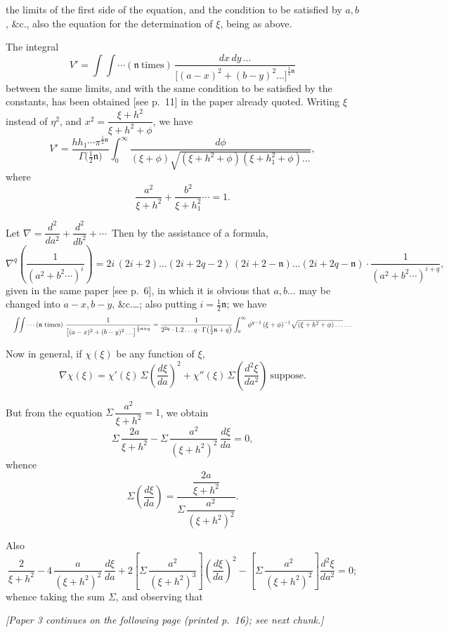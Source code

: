 \documentclass[11pt]{article}
\begin{document}
\clearpage

the limits of the first side of the equation, and the condition to be satisfied by $a, b$, \&c., also the equation for the determination of $\xi$, being as above.

The integral
\[
V' = \int\!\!\int \cdots (\mathfrak{n}\ \text{times})\,\frac{dx\,dy\,\ldots}{\bigl[(a - x)^{2} + (b - y)^{2}\ldots\bigr]^{\frac{1}{2}\mathfrak{n}}}
\]
between the same limits, and with the same condition to be satisfied by the constants, has been obtained [see p.~11] in the paper already quoted. Writing $\xi$ instead of $\eta^{2}$, and $x^{2} = \dfrac{\xi + h^{2}}{\xi + h^{2} + \phi}$, we have
\[
V' = \frac{hh_{1}\cdots\pi^{\frac{1}{2}\mathfrak{n}}}{\Gamma\bigl(\tfrac{1}{2}\mathfrak{n}\bigr)}\int_{0}^{\infty}\frac{d\phi}{(\xi + \phi)\sqrt{(\xi + h^{2} + \phi)(\xi + h_{1}^{2} + \phi)\ldots}},
\]
where
\[
\frac{a^{2}}{\xi + h^{2}} + \frac{b^{2}}{\xi + h_{1}^{2}}\cdots = 1.
\]

Let $\nabla = \dfrac{d^{2}}{da^{2}} + \dfrac{d^{2}}{db^{2}} + \cdots$\ Then by the assistance of a formula,
\[
\nabla^{q}\left(\frac{1}{(a^{2} + b^{2}\cdots)^{i}}\right) = 2i\,(2i + 2)\ldots(2i + 2q - 2)\,(2i + 2 - \mathfrak{n})\ldots(2i + 2q - \mathfrak{n})\cdot\frac{1}{(a^{2} + b^{2}\cdots)^{i + q}},
\]
given in the same paper [see p.~6], in which it is obvious that $a, b \ldots$ may be changed into $a - x, b - y$, \&c.\ldots; also putting $i = \tfrac{1}{2}\mathfrak{n}$; we have
\[ \resizebox{\textwidth}{!}{$\displaystyle
\int\!\!\int \cdots (\mathfrak{n}\ \text{times})\ \frac{1}{\bigl[(a - x)^{2} + (b - y)^{2}\ldots\bigr]^{\frac{1}{2}\mathfrak{n} + q}}
= \frac{1}{2^{2q}\cdot 1.2\ldots q\cdot\Gamma\bigl(\tfrac{1}{2}\mathfrak{n} + q\bigr)}\int_{0}^{\infty}\phi^{q-1}\,(\xi + \phi)^{-1}\sqrt{(\xi + h^{2} + \phi)\ldots}\ldots
$} \]

\medskip

Now in general, if $\chi(\xi)$ be any function of $\xi$,
\[
\nabla \chi(\xi) = \chi'(\xi)\,\Sigma\left(\frac{d\xi}{da}\right)^{2} + \chi''(\xi)\,\Sigma\left(\frac{d^{2}\xi}{da^{2}}\right)\ \text{suppose.}
\]

But from the equation $\Sigma\,\dfrac{a^{2}}{\xi + h^{2}} = 1$, we obtain
\[
\Sigma\,\frac{2a}{\xi + h^{2}} - \Sigma\,\frac{a^{2}}{(\xi + h^{2})^{2}}\,\frac{d\xi}{da} = 0,
\]
whence
\[
\Sigma\left(\frac{d\xi}{da}\right) = \frac{\dfrac{2a}{\xi + h^{2}}}{\Sigma\,\dfrac{a^{2}}{(\xi + h^{2})^{2}}}.
\]

Also
\[
\frac{2}{\xi + h^{2}} - 4\,\frac{a}{(\xi + h^{2})^{2}}\,\frac{d\xi}{da} + 2\left[\Sigma\,\frac{a^{2}}{(\xi + h^{2})^{3}}\right]\left(\frac{d\xi}{da}\right)^{2} - \left[\Sigma\,\frac{a^{2}}{(\xi + h^{2})^{2}}\right]\frac{d^{2}\xi}{da^{2}} = 0;
\]
whence taking the sum $\Sigma$, and observing that
\[
\quad
\]

\noindent\textit{[Paper 3 continues on the following page (printed p.~16); see next chunk.]}
\end{document}
